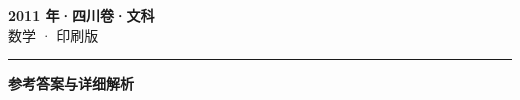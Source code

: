 \documentclass[zihao=5, a4paper]{ctexart}
\begin{document}
\begin{center}
  {\Large\bfseries 2011 年·四川卷·文科}\\[4pt]
  {\large 数学 · 印刷版}
\end{center}
\medskip
{}

\par\bigskip\hrule\bigskip
{}
\begin{center}{\large\bfseries 参考答案与详细解析}\end{center}
\smallskip

\end{document}
